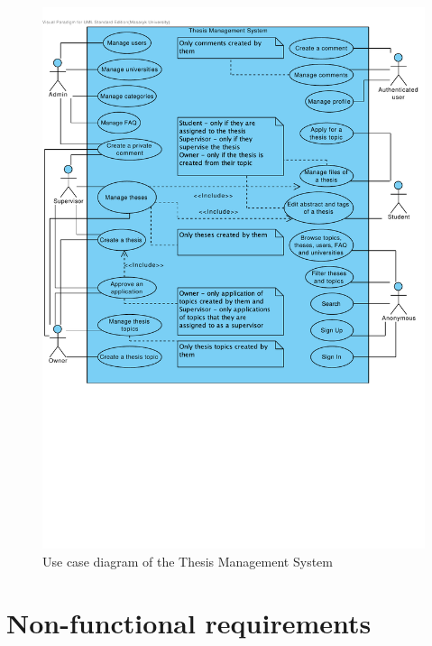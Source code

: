 \begin{figure}[H]
    \centering
        \includegraphics[trim=0 250 10 30, clip, keepaspectratio, width=\textwidth]{./images/use-case.pdf}
    \caption{Use case diagram of the Thesis Management System}
\end{figure}

\section{Non-functional requirements}

